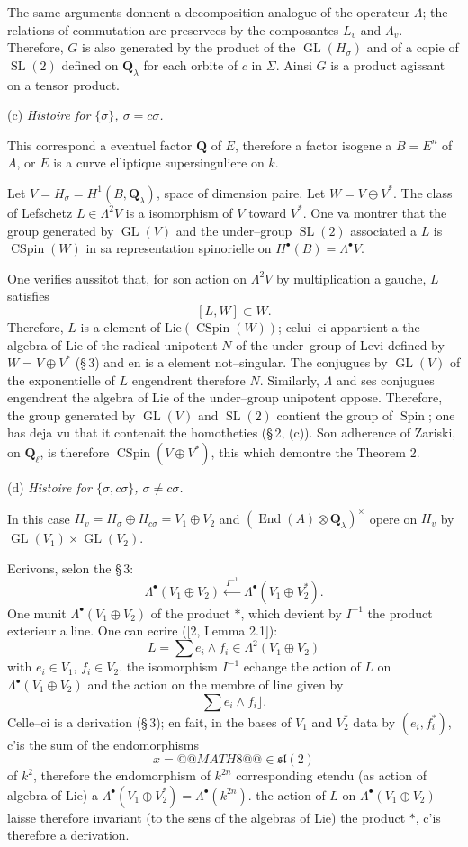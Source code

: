 \documentclass[11pt,a4paper]{article}
\theoremstyle{plain}
\theoremstyle{definition}
\DeclareMathOperator{\End}{End}
\DeclareMathOperator{\CSpin}{CSpin}
\DeclareMathOperator{\SL}{SL}
\DeclareMathOperator{\GL}{GL}
\DeclareMathOperator{\Spin}{Spin}
\begin{document}
The same arguments donnent a decomposition analogue of the operateur $\Lambda$; the relations of commutation are preservees by the composantes $L_v$ and $\Lambda_v$. Therefore, $G$ is also generated by the product of the $\GL(H_\sigma)$ and of a copie of $\SL(2)$ defined on $\mathbf{Q}_\lambda$ for each orbite of $c$ in $\Sigma$. Ainsi $G$ is a product agissant on a tensor product.

(c) \textit{Histoire for $\{\sigma\}$, $\sigma = c\sigma$.}

This correspond a eventuel factor $\mathbf{Q}$ of $E$, therefore a factor isogene a $B = E^n$ of $A$, or $E$ is a curve elliptique supersinguliere on $k$.

Let $V = H_\sigma = H^1(B, \mathbf{Q}_\lambda)$, space of dimension paire. Let $W = V \oplus V^*$. The class of Lefschetz $L \in \Lambda^2 V$ is a isomorphism of $V$ toward $V^*$. One va montrer that the group generated by $\GL(V)$ and the under--group $\SL(2)$ associated a $L$ is $\CSpin(W)$ in sa representation spinorielle on $H^\bullet(B) = \Lambda^\bullet V$.

One verifies aussitot that, for son action on $\Lambda^2 V$ by multiplication a gauche, $L$ satisfies
\[
[L, W] \subset W .
\]
Therefore, $L$ is a element of $\mathrm{Lie}(\CSpin(W))$; celui--ci appartient a the algebra of Lie of the radical unipotent $N$ of the under--group of Levi defined by $W = V \oplus V^*$ (\S\,3) and en is a element not--singular. The conjugues by $\GL(V)$ of the exponentielle of $L$ engendrent therefore $N$. Similarly, $\Lambda$ and ses conjugues engendrent the algebra of Lie of the under--group unipotent oppose. Therefore, the group generated by $\GL(V)$ and $\SL(2)$ contient the group of $\Spin$; one has deja vu that it contenait the homotheties (\S\,2, (c)). Son adherence of Zariski, on $\mathbf{Q}_\ell$, is therefore $\CSpin(V \oplus V^*)$, this which demontre the Theorem 2.

(d) \textit{Histoire for $\{\sigma, c\sigma\}$, $\sigma \neq c\sigma$.}

In this case $H_v = H_\sigma \oplus H_{c\sigma} = V_1 \oplus V_2$ and $(\End(A) \otimes \mathbf{Q}_\lambda)^\times$ opere on $H_v$ by $\GL(V_1) \times \GL(V_2)$.

Ecrivons, selon the \S\,3:
\[
\Lambda^\bullet(V_1 \oplus V_2) \xleftarrow{\ I^{-1}\ } \Lambda^\bullet(V_1 \oplus V_2^*) .
\]
One munit $\Lambda^\bullet(V_1 \oplus V_2)$ of the product $*$, which devient by $I^{-1}$ the product exterieur a line. One can ecrire ([2, Lemma 2.1]):
\[
L = \sum e_i \wedge f_i \in \Lambda^2(V_1 \oplus V_2)
\]
with $e_i \in V_1$, $f_i \in V_2$. the isomorphism $I^{-1}$ echange the action of $L$ on $\Lambda^\bullet(V_1 \oplus V_2)$ and the action on the membre of line given by
\[
\sum e_i \wedge f_i \rfloor .
\]
Celle--ci is a derivation (\S\,3); en fait, in the bases of $V_1$ and $V_2^*$ data by $(e_i, f_i^*)$, c'is the sum of the endomorphisms
\[
x = @@MATH8@@ \in \mathfrak{sl}(2)
\]
of $k^2$, therefore the endomorphism of $k^{2n}$ corresponding etendu (as action of algebra of Lie) a $\Lambda^\bullet(V_1 \oplus V_2^*) = \Lambda^\bullet(k^{2n})$. the action of $L$ on $\Lambda^\bullet(V_1 \oplus V_2)$ laisse therefore invariant (to the sens of the algebras of Lie) the product $*$, c'is therefore a derivation.
\end{document}
